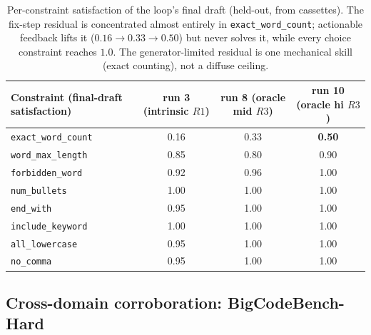 \documentclass[11pt]{article}
\begin{document}
\begin{table}[h]
\centering
\small
\setlength{\tabcolsep}{5pt}
\begin{tabular}{lccc}
\toprule
Constraint (final-draft satisfaction) & run 3 (intrinsic $R1$) & run 8 (oracle mid $R3$) & run 10 (oracle hi $R3$) \\
\midrule
\texttt{exact\_word\_count}  & 0.16 & 0.33 & \textbf{0.50} \\
\texttt{word\_max\_length}   & 0.85 & 0.80 & 0.90 \\
\texttt{forbidden\_word}     & 0.92 & 0.96 & 1.00 \\
\texttt{num\_bullets}        & 1.00 & 1.00 & 1.00 \\
\texttt{end\_with}           & 0.95 & 1.00 & 1.00 \\
\texttt{include\_keyword}    & 1.00 & 1.00 & 1.00 \\
\texttt{all\_lowercase}      & 0.95 & 1.00 & 1.00 \\
\texttt{no\_comma}           & 0.95 & 1.00 & 1.00 \\
\bottomrule
\end{tabular}
\caption{Per-constraint satisfaction of the loop's final draft (held-out, from
cassettes). The fix-step residual is concentrated almost entirely in
\texttt{exact\_word\_count}; actionable feedback lifts it ($0.16\!\to\!0.33\!\to\!0.50$)
but never solves it, while every choice constraint reaches $1.0$. The generator-limited
residual is one mechanical skill (exact counting), not a diffuse ceiling.}
\label{tab:residual}
\end{table}

\subsection{Cross-domain corroboration: BigCodeBench-Hard}
\label{sec:bcb}
\end{document}
